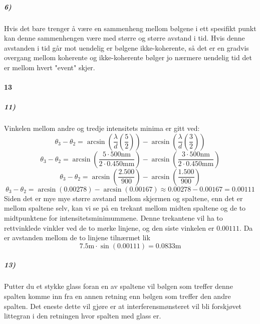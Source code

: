 \documentclass[11pt, A4paper,norsk]{article}
\begin{document}
			\subparagraph{6)}
				\begin{flushleft}
Hvis det bare trenger å være en sammenheng mellom bølgene i ett spesifikt punkt kan denne sammenhengen være med større og større avstand i tid. Hvis denne avstanden i tid går mot uendelig er bølgene ikke-koherente, så det er en gradvis overgang mellom koherente og ikke-koherente bølger jo nærmere uendelig tid det er mellom hvert "event" skjer.
				\end{flushleft}

			








		\paragraph{13}
			\subparagraph{11)}
				\begin{flushleft}
Vinkelen mellom andre og tredje intensitets minima er gitt ved:
$$\theta_{3} - \theta_{2} = \arcsin\left( \frac{\lambda}{d} \left( \frac{5}{2} \right) \right) - \arcsin\left( \frac{\lambda}{d} \left( \frac{3}{2} \right) \right)$$
$$\theta_{3} - \theta_{2} = \arcsin\left( \frac{5 \cdot 500 \text{nm}}{2 \cdot 0.450 \text{mm}} \right) - \arcsin\left( \frac{3 \cdot 500 \text{nm}}{2 \cdot 0.450 \text{mm}} \right)$$
$$\theta_{3} - \theta_{2} = \arcsin\left( \frac{2.500}{900} \right) - \arcsin\left( \frac{1.500}{900} \right)$$
$$\theta_{3} - \theta_{2} = \arcsin\left( 0.00278 \right) - \arcsin\left( 0.00167 \right) \approx 0.00278 - 0.00167 = 0.00111$$
Siden det er mye mye større avstand mellom skjermen og spaltene, enn det er mellom spaltene selv, kan vi se på en trekant mellom midten spaltene og de to midtpunktene for intensitetsminimummene. Denne trekantene vil ha to rettvinklede vinkler ved de to mørke linjene, og den siste vinkelen er $0.00111$. Da er avstanden mellom de to linjene tilnærmet lik
$$7.5 \text{m} \cdot  \sin(0.00111) = 0.0833 \text{m}$$
				\end{flushleft}










			\subparagraph{13)}
				\begin{flushleft}
Putter du et stykke glass foran en av spaltene vil bølgen som treffer denne spalten komme inn fra en annen retning enn bølgen som treffer den andre spalten. Det eneste dette vil gjøre er at interferensmønsteret vil bli forskjøvet littegran i den retningen hvor spalten med glass er.
				\end{flushleft}
\end{document}
